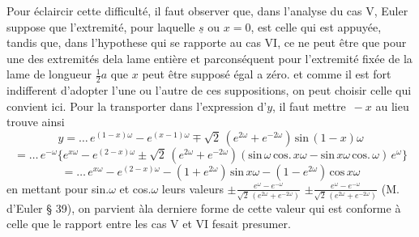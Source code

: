 \documentclass[11pt,a4paper]{article}
\begin{document}
Pour éclaircir cette difficulté, il faut observer que, dans l'analyse du cas V,
Euler suppose que l'extremité, pour laquelle $\underline{s}$ ou $x = 0$, est celle qui est appuyée,
tandis que, dans l'hypothese qui se rapporte au cas VI, ce ne peut être que pour
une des extremités dela lame entière et parconséquent pour l'extremité fixée de
la lame de longueur $\frac{1}{2}a$ que $x$ peut être supposé égal a zéro. et comme
il est fort indifferent d'adopter l'une ou l'autre de ces suppositions, on peut
choisir celle qui convient ici. Pour la transporter dans l'expression d'$y$, il
faut mettre $\,- x$ au lieu   trouve ainsi
\[ y = \ldots\, e^{(1-x)\omega} - e^{(x-1)\omega} \mp \sqrt{2}\,(e^{2\omega} + e^{-2\omega})\,\text{sin}\,(1-x)\omega \]
\[ = \ldots\, e^{-\omega}\{e^{x\omega} - e^{(2-x)\omega} \pm \sqrt{2}\,(e^{2\omega} + e^{-2\omega})(\text{sin}\,\omega\,\text{cos.}\,x\omega - \text{sin}\,x\omega\,\text{cos.}\,\omega)\,e^{\omega}\} \]
\[ = \ldots\, e^{x\omega} - e^{(2-x)\omega} - (1 + e^{2\omega})\,\text{sin}\,x\omega - (1 - e^{2\omega})\,\text{cos}\,x\omega \]
en mettant pour sin.$\omega$ et cos.$\omega$ leurs valeurs $\pm\frac{e^{\omega} - e^{-\omega}}{\sqrt{2}\,(e^{2\omega} + e^{-2\omega})}$ $\pm\frac{e^{\omega} - e^{-\omega}}{\sqrt{2}\,(e^{2\omega} + e^{-2\omega})}$ (M. d'Euler § 39),
on parvient àla derniere forme de cette valeur qui est conforme à celle que
le rapport entre les cas V et VI fesait presumer.
\end{document}
